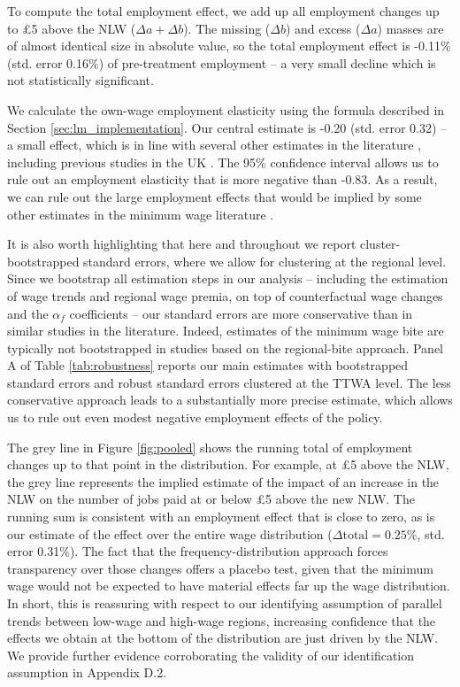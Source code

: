 To compute the total employment effect, we add up all employment changes up to \pounds 5 above the NLW ($\Delta a + \Delta b$). The missing ($\Delta b$) and excess ($\Delta a$) masses are of almost identical size in absolute value, so the total employment effect is -0.11\% (std. error 0.16\%) of pre-treatment employment -- a very small decline which is not statistically significant.

We calculate the own-wage employment elasticity using the formula described in Section \ref{sec:lm_implementation}. Our central estimate is -0.20 (std. error 0.32) -- a small effect, which is in line with several other estimates in the literature \citep{Dube2019b}, including previous studies in the UK \citep{Stewart2004,Dube2019b,Manning2021}. The 95\% confidence interval allows us to rule out an employment elasticity that is more negative than -0.83. As a result, we can rule out the large employment effects that would be implied by some other estimates in the minimum wage literature \citep{Dube2019b}.

It is also worth highlighting that here and throughout we report cluster-bootstrapped standard errors, where we allow for clustering at the regional level. Since we bootstrap all estimation steps in our analysis -- including the estimation of wage trends and regional wage premia, on top of counterfactual wage changes and the $\alpha_f$ coefficients -- our standard errors are more conservative than in similar studies in the literature. Indeed, estimates of the minimum wage bite are typically not bootstrapped in studies based on the regional-bite approach. Panel A of Table \ref{tab:robustness} reports our main estimates with bootstrapped standard errors and robust standard errors clustered at the TTWA level. The less conservative approach leads to a substantially more precise estimate, which allows us to rule out even modest negative employment effects of the policy.

The grey line in Figure \ref{fig:pooled} shows the running total of employment changes up to that point in the distribution. For example, at \pounds 5 above the NLW, the grey line represents the implied estimate of the impact of an increase in the NLW on the number of jobs paid at or below \pounds 5 above the new NLW. The running sum is consistent with an employment effect that is close to zero, as is our estimate of the effect over the entire wage distribution ($\Delta \text{total}=0.25\%$, std. error 0.31\%). The fact that the frequency-distribution approach forces transparency over those changes offers a placebo test, given that the minimum wage would not be expected to have material effects far up the wage distribution. In short, this is reassuring with respect to our identifying assumption of parallel trends between low-wage and high-wage regions, increasing confidence that the effects we obtain at the bottom of the distribution are just driven by the NLW. We provide further evidence corroborating the validity of our identification assumption in Appendix D.2.




